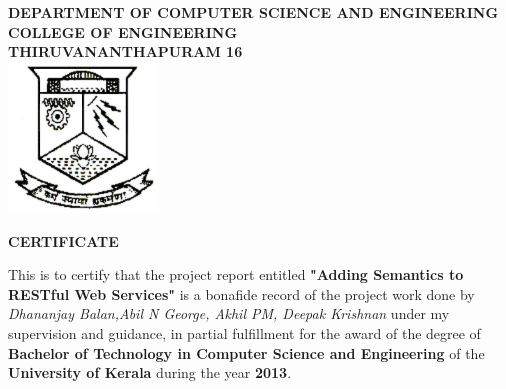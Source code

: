 \documentclass[12pt]{report}
\begin{document}


\newpage
\thispagestyle{empty}
\begin{center}
\textsc{{\textbf{DEPARTMENT OF COMPUTER SCIENCE AND ENGINEERING}}}\\
\vspace{1mm}
\textsc{\textbf{COLLEGE OF ENGINEERING}}\\
\vspace{1mm}
\textsc{\textbf{THIRUVANANTHAPURAM 16}}\\
\vspace{6mm}
\includegraphics[width=0.3\textwidth]{images/cet_logo.jpg}\\
\vspace{10mm}

\textbf{CERTIFICATE}
\vspace{5mm}
\end{center}
\begin{spacing}{1.5}
This is to certify that the project report entitled {\bf "Adding Semantics to RESTful Web Services"} is a bonafide record of the project work done by {\it Dhananjay Balan,Abil N George, Akhil PM, Deepak Krishnan}  under my supervision and guidance, in partial fulfillment for the award of the degree of {\bf Bachelor of Technology in Computer Science and Engineering} of the {\bf University of Kerala} during the year {\bf 2013}.\\
\end{spacing}
\vspace{6mm}
\\
\vspace{9mm} \\
 \\
 \\
 \\
 \\
 \\
 \\
\end{document}
